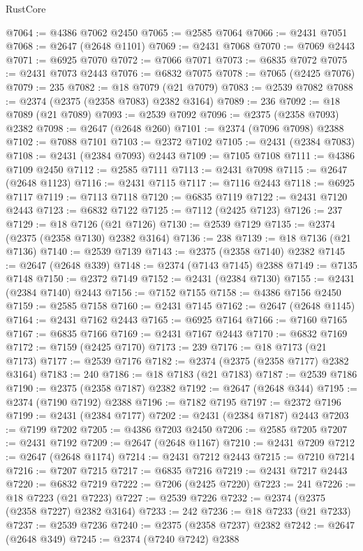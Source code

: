 \begin{lexlean}{RustCore}
\begin{coremodule}
@7064 := @4386 @7062 @2450
@7065 := @2585 @7064
@7066 := @2431 @7051
@7068 := @2647 (@2648 @1101)
@7069 := @2431 @7068
@7070 := @7069 @2443
@7071 := @6925 @7070
@7072 := @7066 @7071
@7073 := @6835 @7072
@7075 := @2431 @7073 @2443
@7076 := @6832 @7075
@7078 := @7065 (@2425 @7076)
@7079 := 235
@7082 := @18 @7079 (@21 @7079)
@7083 := @2539 @7082
@7088 := @2374 (@2375 (@2358 @7083) @2382 @3164)
@7089 := 236
@7092 := @18 @7089 (@21 @7089)
@7093 := @2539 @7092
@7096 := @2375 (@2358 @7093) @2382
@7098 := @2647 (@2648 @260)
@7101 := @2374 (@7096 @7098) @2388
@7102 := @7088 @7101
@7103 := @2372 @7102
@7105 := @2431 (@2384 @7083)
@7108 := @2431 (@2384 @7093) @2443
@7109 := @7105 @7108
@7111 := @4386 @7109 @2450
@7112 := @2585 @7111
@7113 := @2431 @7098
@7115 := @2647 (@2648 @1123)
@7116 := @2431 @7115
@7117 := @7116 @2443
@7118 := @6925 @7117
@7119 := @7113 @7118
@7120 := @6835 @7119
@7122 := @2431 @7120 @2443
@7123 := @6832 @7122
@7125 := @7112 (@2425 @7123)
@7126 := 237
@7129 := @18 @7126 (@21 @7126)
@7130 := @2539 @7129
@7135 := @2374 (@2375 (@2358 @7130) @2382 @3164)
@7136 := 238
@7139 := @18 @7136 (@21 @7136)
@7140 := @2539 @7139
@7143 := @2375 (@2358 @7140) @2382
@7145 := @2647 (@2648 @339)
@7148 := @2374 (@7143 @7145) @2388
@7149 := @7135 @7148
@7150 := @2372 @7149
@7152 := @2431 (@2384 @7130)
@7155 := @2431 (@2384 @7140) @2443
@7156 := @7152 @7155
@7158 := @4386 @7156 @2450
@7159 := @2585 @7158
@7160 := @2431 @7145
@7162 := @2647 (@2648 @1145)
@7164 := @2431 @7162 @2443
@7165 := @6925 @7164
@7166 := @7160 @7165
@7167 := @6835 @7166
@7169 := @2431 @7167 @2443
@7170 := @6832 @7169
@7172 := @7159 (@2425 @7170)
@7173 := 239
@7176 := @18 @7173 (@21 @7173)
@7177 := @2539 @7176
@7182 := @2374 (@2375 (@2358 @7177) @2382 @3164)
@7183 := 240
@7186 := @18 @7183 (@21 @7183)
@7187 := @2539 @7186
@7190 := @2375 (@2358 @7187) @2382
@7192 := @2647 (@2648 @344)
@7195 := @2374 (@7190 @7192) @2388
@7196 := @7182 @7195
@7197 := @2372 @7196
@7199 := @2431 (@2384 @7177)
@7202 := @2431 (@2384 @7187) @2443
@7203 := @7199 @7202
@7205 := @4386 @7203 @2450
@7206 := @2585 @7205
@7207 := @2431 @7192
@7209 := @2647 (@2648 @1167)
@7210 := @2431 @7209
@7212 := @2647 (@2648 @1174)
@7214 := @2431 @7212 @2443
@7215 := @7210 @7214
@7216 := @7207 @7215
@7217 := @6835 @7216
@7219 := @2431 @7217 @2443
@7220 := @6832 @7219
@7222 := @7206 (@2425 @7220)
@7223 := 241
@7226 := @18 @7223 (@21 @7223)
@7227 := @2539 @7226
@7232 := @2374 (@2375 (@2358 @7227) @2382 @3164)
@7233 := 242
@7236 := @18 @7233 (@21 @7233)
@7237 := @2539 @7236
@7240 := @2375 (@2358 @7237) @2382
@7242 := @2647 (@2648 @349)
@7245 := @2374 (@7240 @7242) @2388

\end{coremodule}
\end{lexlean}
